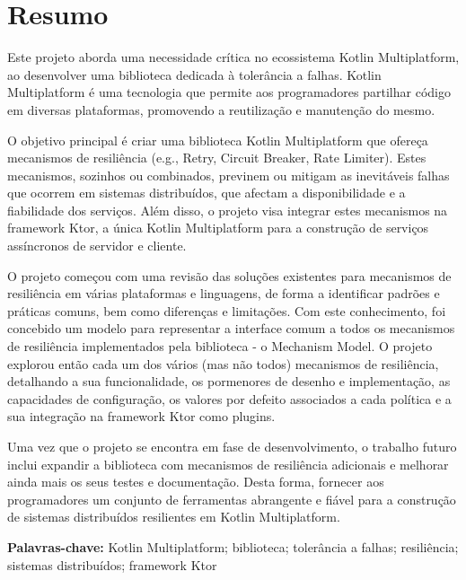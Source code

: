 \chapter*{Resumo}\label{ch:resumo}

Este projeto aborda uma necessidade crítica no ecossistema Kotlin Multiplatform,
ao desenvolver uma biblioteca dedicada à tolerância a falhas.
Kotlin Multiplatform é uma tecnologia que permite aos programadores partilhar código em diversas plataformas, promovendo a reutilização e manutenção do mesmo.

O objetivo principal é
criar uma biblioteca Kotlin Multiplatform
que ofereça mecanismos de resiliência (e.g., Retry, Circuit Breaker, Rate Limiter).
Estes mecanismos, sozinhos ou combinados, previnem ou mitigam as inevitáveis falhas que
ocorrem em sistemas distribuídos,
que afectam a disponibilidade e a fiabilidade dos serviços.
Além disso, o projeto visa integrar estes mecanismos na framework Ktor,
a única Kotlin Multiplatform para a construção de serviços assíncronos de servidor e cliente.

O projeto começou com uma revisão das soluções existentes para mecanismos de resiliência em várias plataformas e linguagens, de forma a identificar padrões e práticas comuns, bem como diferenças e limitações.
Com este conhecimento,
foi concebido um modelo para representar a interface comum a todos os mecanismos de resiliência implementados pela biblioteca - o Mechanism Model.
O projeto explorou então cada um dos
vários (mas não todos) mecanismos de resiliência,
detalhando a sua funcionalidade,
os pormenores de desenho e implementação, as capacidades de configuração, os valores por defeito associados a cada política e a sua integração na framework Ktor como plugins.

Uma vez que o projeto se encontra em fase de desenvolvimento, o trabalho futuro inclui
expandir a biblioteca com mecanismos de resiliência adicionais
e melhorar ainda mais os seus testes e documentação.
Desta forma, fornecer aos programadores um conjunto de ferramentas abrangente e fiável para a construção de sistemas distribuídos resilientes
em Kotlin Multiplatform.

\textbf{Palavras-chave:} Kotlin Multiplatform; biblioteca; tolerância a falhas; resiliência; sistemas distribuídos; framework Ktor

